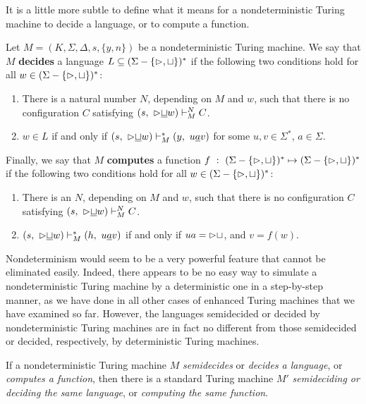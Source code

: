 It is a little more subtle to define what it means for a nondeterministic Turing machine to decide a language, or to compute a function.
\begin{definition}{}
Let $M = (K, \Sigma, \Delta, s, \{ y, n\})$ be a nondeterministic Turing 
machine. We say that $M$ \textbf{decides} a language $L \subseteq (\Sigma - \{ \vartriangleright, \sqcup \})^*$ if the following two conditions hold for all $w \in (\Sigma - \{ \vartriangleright, \sqcup \})^*$:
\begin{enumerate}[label=(\alph*)]
  \item There is a natural number $N$, depending on $M$ and $w$, such that there is no configuration $C$ satisfying $(s,\ {\vartriangleright}{\underline{\sqcup}}w) \vdash_M^N C$.
  \item $w \in L$ if and only if $(s,\ {\tar}{\underline{\blank}}w) \vdash_M^* (y,\ u\underline{a}v)$ for some $u, v \in \Sigma^*$, $a \in \Sigma$.
\end{enumerate}
\quad Finally, we say that $M$ \textbf{computes} a function $f\ :\ (\Sigma - \{ \tar, \blank \})^* \mapsto (\Sigma - \{ \tar, \blank \})^*$ if the following two conditions hold for all $w \in (\Sigma - \{ \vartriangleright, \sqcup \})^*$: 
\begin{enumerate}[label=(\alph*)]
  \item There is an $N$, depending on $M$ and $w$, such that there is no configuration $C$ satisfying $(s,\ {\vartriangleright}{\underline{\sqcup}}w) \vdash_M^N C$.
  \item $(s,\ {\vartriangleright}{\underline{\sqcup}}w) \vdash_M^* (h,\ u\underline{a}v)$ if and only if $ua = {\vartriangleright}{\sqcup}$, and $v = f(w)$.
\end{enumerate}
\end{definition}

Nondeterminism would seem to be a very powerful feature that cannot be eliminated easily. Indeed, there appears to be no easy way to simulate a nondeterministic Turing machine by a deterministic one in a step-by-step manner, as we have done in all other cases of enhanced Turing machines that we have examined so far. However, the languages semidecided or decided by nondeterministic Turing machines are in fact no different from those semidecided or decided, respectively, by deterministic Turing machines.
\begin{theorem}{}
If a nondeterministic Turing machine $M$ \textit{semidecides} or \textit{decides a language}, or \textit{computes a function}, then there is a standard Turing machine $M'$ \textit{semideciding or deciding the same language}, or \textit{computing the same function}.
\end{theorem}

